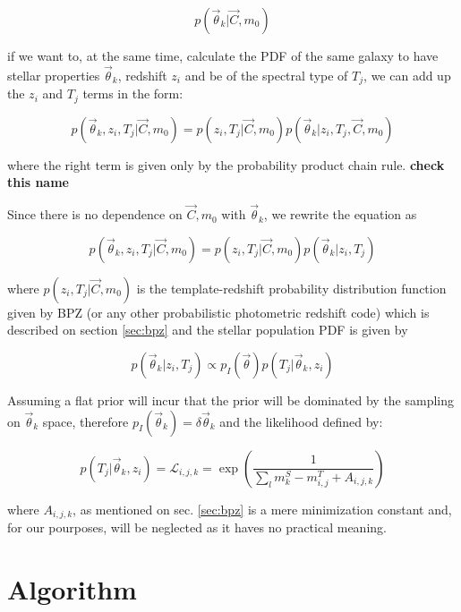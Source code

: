 \documentclass[9pt]{memoir}
\begin{document}
\begin{equation}
p(\vec{\theta}_k | \vec{C}, m_0)
\end{equation}

if we want to, at the same time, calculate the PDF of the same galaxy to have stellar properties $\vec{\theta}_k$, redshift $z_i$ and be of the spectral type of $T_j$, we can add up the $z_i$ and $T_j$ terms in the form:

\begin{equation}
p(\vec{\theta}_k, z_i, T_j | \vec{C}, m_0) = p(z_i, T_j|\vec{C}, m_0)p(\vec{\theta}_k|z_i,T_j,\vec{C},m_0)
\end{equation}

\noindent where the right term is given only by the probability product chain rule. \textbf{check this name}

Since there is no dependence on $\vec{C}, m_0$ with $\vec{\theta}_k$, we rewrite the equation as

\begin{equation}
p(\vec{\theta}_k, z_i, T_j | \vec{C}, m_0) = p(z_i, T_j|\vec{C}, m_0)p(\vec{\theta}_k|z_i,T_j)
\end{equation}

\noindent where $p(z_i, T_j|\vec{C}, m_0)$ is the template-redshift probability distribution function given by BPZ (or any other probabilistic photometric redshift code) which is described on section \ref{sec:bpz} and the stellar population PDF is given by

\begin{equation}
\label{eq:stellar_pop_props}
p(\vec{\theta}_k|z_i,T_j) \propto p_I(\vec{\theta}) p(T_j|\vec{\theta}_k, z_i)
\end{equation}

Assuming a flat prior will incur that the prior will be dominated by the sampling on $\vec{\theta}_k$ space, therefore $p_I (\vec{\theta}_k) = \delta \vec{\theta}_k$ and the likelihood defined by:

\begin{equation}
p(T_j|\vec{\theta}_k, z_i) = \mathcal{L}_{i,j,k} = \exp \left( \frac{1}{\sum_l m^S_k - m^T_{i,j} + A_{i,j,k}} \right)
\end{equation}

where $A_{i,j,k}$, as mentioned on sec. \ref{sec:bpz} is a mere minimization constant and, for our pourposes, will be neglected as it haves no practical meaning.

\section{Algorithm}
\end{document}
